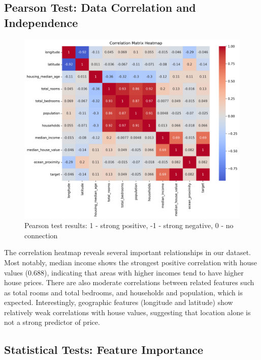 \documentclass[a4paper, 11pt]{article}
\begin{document}
\subsection{Pearson Test: Data Correlation and Independence}
\begin{figure}[h]
    \centering
    \includegraphics[scale=0.5]{figs/correlation_heatmap.png}
    \caption{Pearson test results: 1 - strong positive, -1 - strong negative, 0 - no connection}
    \label{fig:correlation_heatmap}
\end{figure}

The correlation heatmap reveals several important relationships in our dataset. Most notably, median income shows the strongest positive correlation with house values (0.688), indicating that areas with higher incomes tend to have higher house prices. There are also moderate correlations between related features such as total rooms and total bedrooms, and households and population, which is expected. Interestingly, geographic features (longitude and latitude) show relatively weak correlations with house values, suggesting that location alone is not a strong predictor of price.

\subsection{Statistical Tests: Feature Importance}
\end{document}
